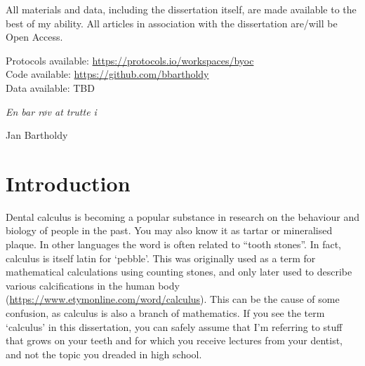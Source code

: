 \documentclass[
  letterpaper,
]{book}
\begin{document}

All materials and data, including the dissertation itself, are made
available to the best of my ability. All articles in association with
the dissertation are/will be Open Access.

Protocols available: \url{https://protocols.io/workspaces/byoc}\\
Code available: \url{https://github.com/bbartholdy}\\
Data available: TBD

\clearpage
\thispagestyle{empty}
\vspace*{3cm}

\hfill\textit{En bar røv at trutte i}

\par

\hfill\vspace*{4cm} Jan Bartholdy \vspace*{\fill}

\mainmatter


\hypertarget{chap-intro}{%
\chapter{Introduction}\label{chap-intro}}

Dental calculus is becoming a popular substance in research on the
behaviour and biology of people in the past. You may also know it as
tartar or mineralised plaque. In other languages the word is often
related to ``tooth stones''. In fact, calculus is itself latin for
`pebble'. This was originally used as a term for mathematical
calculations using counting stones, and only later used to describe
various calcifications in the human body
(\url{https://www.etymonline.com/word/calculus}). This can be the cause
of some confusion, as calculus is also a branch of mathematics. If you
see the term `calculus' in this dissertation, you can safely assume that
I'm referring to stuff that grows on your teeth and for which you
receive lectures from your dentist, and not the topic you dreaded in
high school.
\end{document}

